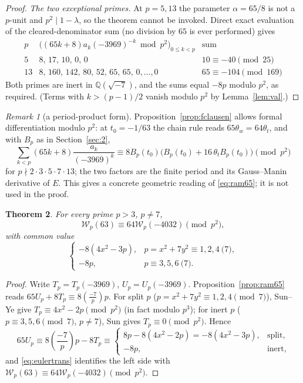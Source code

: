 \documentclass[11pt]{amsart}
\newtheorem{theorem}{Theorem}[section]
\theoremstyle{definition}
\theoremstyle{remark}
\newtheorem{remark}[theorem]{Remark}
\newcommand{\Q}{\mathbb{Q}}
\newcommand{\leg}[2]{\left(\frac{#1}{#2}\right)}
\begin{document}
\begin{proof}
\emph{The two exceptional primes.} At $p=5,13$ the parameter
$\alpha=65/8$ is not a $p$-unit and $p^2\mid1-\lambda$, so the theorem
cannot be invoked. Direct exact evaluation of the cleared-denominator
sum (no division by $65$ is ever performed) gives
\[
\begin{array}{c|c|c}
p & \bigl((65k+8)a_k(-3969)^{-k}\bmod p^2\bigr)_{0\le k<p} & \text{sum}\\
\hline
5 & 8,\,17,\,10,\,0,\,0 & 10\equiv-40\pmod{25}\\
13 & 8,\,160,\,142,\,80,\,52,\,65,\,65,\,0,\dots,0 & 65\equiv-104\pmod{169}
\end{array}
\]
Both primes are inert in $\Q(\sqrt{-7})$, and the sums equal
$-8p$ modulo $p^2$, as required. (Terms with $k>(p-1)/2$ vanish modulo
$p^2$ by Lemma~\ref{lem:val}.)
\end{proof}

\begin{remark}[a period-product form]\label{rem:period}
Proposition~\ref{prop:fclausen} allows formal differentiation modulo
$p^2$: at $t_0=-1/63$ the chain rule reads $65\theta_w=64\theta_t$,
and with $B_p$ as in Section~\ref{sec:2},
\[
\sum_{k<p}(65k+8)\frac{a_k}{(-3969)^k}
\equiv8B_p(t_0)\bigl(B_p(t_0)+16\,\theta_tB_p(t_0)\bigr)\pmod{p^2}
\]
for $p\nmid2\cdot3\cdot5\cdot7\cdot13$; the two factors are the finite
period and its Gauss--Manin derivative of $E$. This gives a concrete
geometric reading of \eqref{eq:ram65}; it is not used in the proof.
\end{remark}

\begin{theorem}\label{thm:grpC}
For every prime $p>3$, $p\ne7$,
\[
\mathcal W_p(63)\equiv64\mathcal W_p(-4032)\pmod{p^2},
\]
with common value
\[
\begin{cases}
-8(4x^2-3p),&p=x^2+7y^2\equiv1,2,4\pod7,\\
-8p,&p\equiv3,5,6\pod7.
\end{cases}
\]
\end{theorem}

\begin{proof}
Write $T_p=T_p(-3969)$, $U_p=U_p(-3969)$.
Proposition~\ref{prop:ram65} reads $65U_p+8T_p\equiv8\leg{-7}{p}p$.
For split $p$ ($p=x^2+7y^2\equiv1,2,4\pmod7$), Sun--Ye
\cite[Theorem~1.8]{SunYe} give $T_p\equiv4x^2-2p\pmod{p^2}$ (in fact
modulo $p^3$); for inert $p$ ($p\equiv3,5,6\pmod7$, $p\ne7$), Sun
\cite[Theorem~5.1]{SunL2} gives $T_p\equiv0\pmod{p^2}$. Hence
\[
65U_p\equiv8\leg{-7}{p}p-8T_p\equiv
\begin{cases}
8p-8(4x^2-2p)=-8(4x^2-3p),&\text{split},\\
-8p,&\text{inert},
\end{cases}
\]
and \eqref{eq:eulertrans} identifies the left side with
$\mathcal W_p(63)\equiv64\mathcal W_p(-4032)\pmod{p^2}$.
\end{proof}
\end{document}
